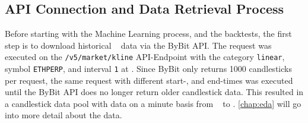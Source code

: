 \subsection{API Connection and Data Retrieval Process}
\label{chap:api-connection}

Before starting with the Machine Learning process, and the backtests, the first step is to download historical \ethusdc~ data via the ByBit API.
The request was executed on the \texttt{/v5/market/kline} API-Endpoint \cite{bybit-api-doc-get-kline} with the category \texttt{linear}, symbol \texttt{ETHPERP}, and interval \texttt{1} at \ethDataEndDate.
Since ByBit only returns 1000 candlesticks per request, the same request with different start-, and end-times was executed until the ByBit API does no longer return older candlestick data.
This resulted in a candlestick data pool with data on a minute basis from \ethDataStartDate~ to \ethDataEndDate.
\autoref{chap:eda} will go into more detail about the data.

